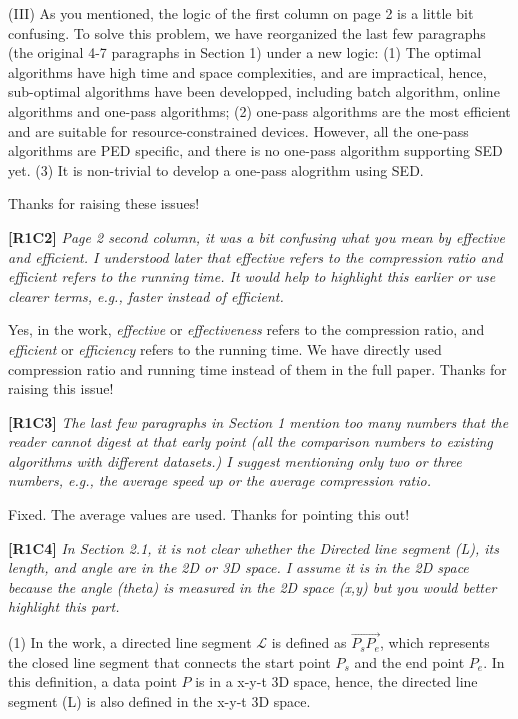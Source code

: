 \documentclass{letter}
\newcommand{\vv}{\overrightarrow}
\begin{document}
(III) As you mentioned, the logic of the first column on page 2 is a little bit confusing. To solve this problem, we have reorganized the last few paragraphs (the original 4-7 paragraphs in Section 1) under a new logic:  (1) The optimal algorithms have high time and space complexities, and are impractical, hence, sub-optimal algorithms have been developped, including batch algorithm, online algorithms and one-pass algorithms; (2) one-pass algorithms are the most efficient and are suitable for resource-constrained devices. However, all the one-pass algorithms are PED specific, and there is no one-pass algorithm supporting SED yet. 
(3) It is non-trivial to develop a one-pass alogrithm using SED.

Thanks for raising these issues!

\textbf{[R1C2]} \emph{Page 2 second column, it was a bit confusing what you mean by effective and efficient. I understood later that effective refers to the compression ratio and efficient refers to the running time. It would help to highlight this earlier or use clearer terms, e.g., faster instead of efficient.}

Yes, in the work, \emph{effective} or \emph{effectiveness} refers to the compression ratio, and \emph{efficient} or \emph{efficiency} refers to the running time. We have directly used compression ratio and running time instead of them in the full paper. Thanks for raising this issue!


\textbf{[R1C3]} \emph{The last few paragraphs in Section 1 mention too many numbers that the reader cannot digest at that early point (all the comparison numbers to existing algorithms with different datasets.) I suggest mentioning only two or three numbers, e.g., the average speed up or the average compression ratio.}

Fixed. The average values are used. Thanks for pointing this out!

\textbf{[R1C4]} \emph{In Section 2.1, it is not clear whether the Directed line segment (L), its length, and angle are in the 2D or 3D space. I assume it is in the 2D space because the angle (theta) is measured in the 2D space (x,y) but you would better highlight this part.}

(1) In the work, a directed line segment $\mathcal{L}$ is defined as $\vv{P_{s}P_{e}}$, which represents the closed line segment that connects the start point $P_s$ and the end point $P_e$. In this definition, a data point $P$ is in a x-y-t 3D space, hence, the directed line segment (L) is also defined in the x-y-t 3D space.
\end{document}
